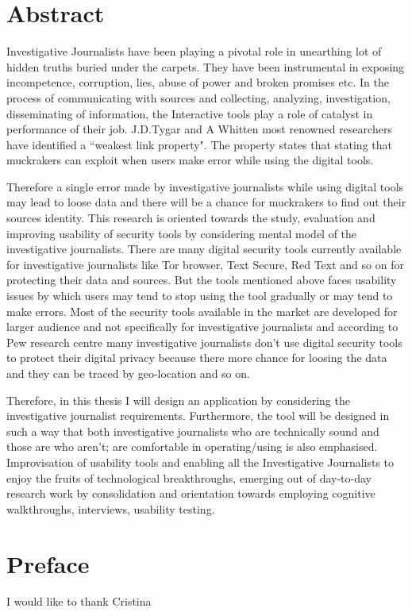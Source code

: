
\thesistitlepage %
\chapter*{Abstract}

Investigative Journalists have been playing a pivotal role in unearthing lot of hidden truths buried under the carpets. They have been instrumental in exposing incompetence, corruption, lies, abuse of power and broken promises etc. In the process of communicating with sources and collecting, analyzing, investigation, disseminating of information, the Interactive tools play a role of catalyst in performance of their job. J.D.Tygar and A Whitten most renowned researchers have identified a “weakest link property". The property states that  stating that muckrakers can exploit when users make error while using the digital tools. 

Therefore a single error made by investigative journalists while using digital tools may lead to loose data and there will be a chance for muckrakers to find out their sources identity. This research is oriented towards the study, evaluation and improving usability of security tools by considering mental model of the investigative journalists. There are many digital security tools currently available for investigative journalists like Tor browser, Text Secure, Red Text and so on for protecting their data and sources. But the tools mentioned above faces usability issues by which users may tend to stop using the tool gradually or may tend to make errors. Most of the security tools available in the market are developed for larger audience and not specifically for investigative journalists and according to Pew research centre many investigative journalists don’t use digital security tools to protect their digital privacy because there more chance for loosing the data and they can be traced by geo-location and so on.

Therefore, in this thesis I will design an application by considering the investigative journalist requirements. Furthermore, the tool will be designed in such a way that both investigative journalists who are technically sound and those are who aren’t; are comfortable in operating/using is also emphasised. Improvisation of usability tools and enabling all the Investigative Journalists to enjoy the fruits of technological breakthroughs, emerging out of day-to-day research work by consolidation and orientation towards employing cognitive walkthroughs, interviews, usability testing.


%

\chapter*{Preface}

I would like to thank Cristina

